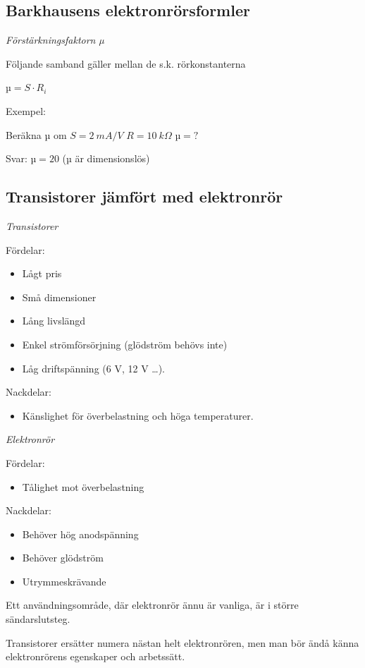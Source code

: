 \subsection{Barkhausens elektronrörsformler}

\emph{Förstärkningsfaktorn µ}

Följande samband gäller mellan de s.k. rörkonstanterna

\(µ = S \cdot R_i\)

Exempel:

Beräkna µ om \(S = 2\ mA/V\) \(R = 10\ kΩ\) \(µ = ?\)

Svar: \(µ = 20\) (µ är dimensionslös)

\subsection{Transistorer jämfört med elektronrör}

\emph{Transistorer}

Fördelar:
\begin{itemize}
\item Lågt pris
\item Små dimensioner
\item Lång livslängd
\item Enkel strömförsörjning (glödström behövs inte)
\item Låg driftspänning (6 V, 12 V \ldots ).
\end{itemize}

Nackdelar:
\begin{itemize}
\item Känslighet för överbelastning och höga temperaturer.
\end{itemize}

\emph{Elektronrör}

Fördelar:
\begin{itemize}
\item Tålighet mot överbelastning
\end{itemize}

Nackdelar:
\begin{itemize}
\item Behöver hög anodspänning
\item Behöver glödström
\item Utrymmeskrävande
\end{itemize}

Ett användningsområde, där elektronrör ännu är vanliga, är i större
sändarslutsteg.

Transistorer ersätter numera nästan helt elektronrören, men man bör ändå känna
elektronrörens egenskaper och arbetssätt.

